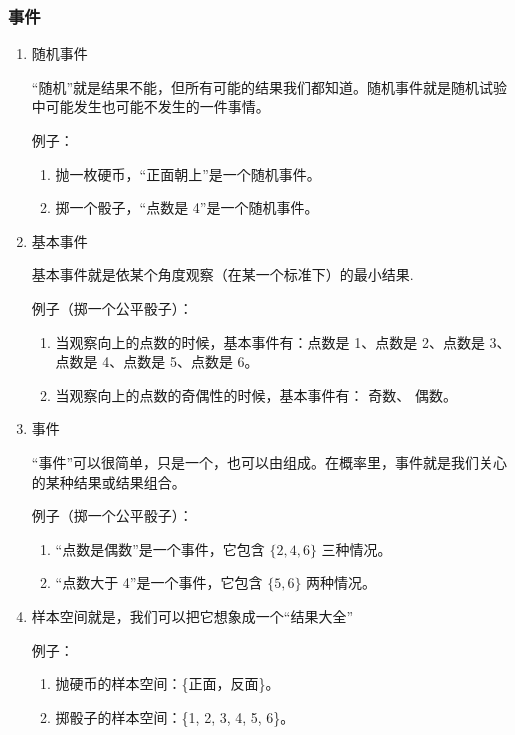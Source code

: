\subsubsection*{事件}
\begin{enumerate}
    \item 随机事件
    
    “随机”就是结果不能，但所有可能的结果我们都知道。随机事件就是随机试验中可能发生也可能不发生的一件事情。
    
    \noindent 例子：
    \begin{enumerate}
        \item 抛一枚硬币，“正面朝上”是一个随机事件。
        \item 掷一个骰子，“点数是 4”是一个随机事件。
    \end{enumerate}

    \item 基本事件

    基本事件就是依某个角度观察（在某一个标准下）的最小结果.

    \noindent 例子（掷一个公平骰子）：
    \begin{enumerate}
        \item 当观察向上的点数的时候，基本事件有：点数是 1、点数是 2、点数是 3、点数是 4、点数是 5、点数是 6。
        \item 当观察向上的点数的奇偶性的时候，基本事件有： 奇数、 偶数。
    \end{enumerate}

    \item 事件
    
    “事件”可以很简单，只是一个，也可以由组成。在概率里，事件就是我们关心的某种结果或结果组合。

    \noindent 例子（掷一个公平骰子）：
    \begin{enumerate}
        \item “点数是偶数”是一个事件，它包含 $ \{2,4,6\} $ 三种情况。
        \item “点数大于 4”是一个事件，它包含 $ \{5,6\} $ 两种情况。
    \end{enumerate}

    \item 样本空间就是，我们可以把它想象成一个“结果大全”

    \noindent 例子：
    \begin{enumerate}
        \item 抛硬币的样本空间：\{正面，反面\}。
        \item 掷骰子的样本空间：\{1, 2, 3, 4, 5, 6\}。
    \end{enumerate}
\end{enumerate}


